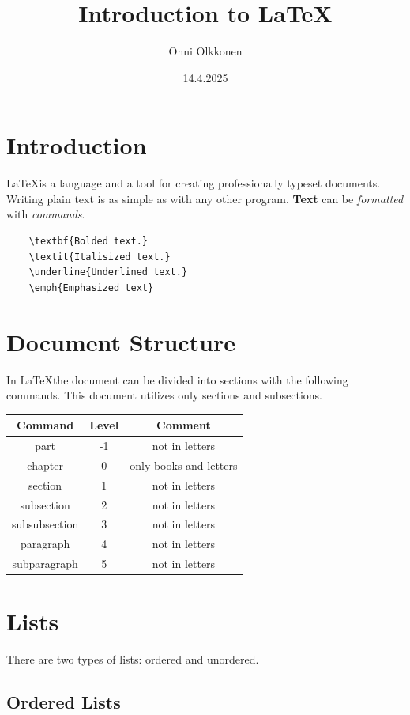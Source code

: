 \documentclass{article}
\title{Introduction to \LaTeX}
\author{Onni Olkkonen}
\date{14.4.2025}
\begin{document}
\maketitle

\section{Introduction}

\LaTeX is a language and a tool for creating professionally typeset documents.
Writing plain text is as simple as with any other program.
\textbf{Text} can be \textit{formatted} with \emph{commands}.

\begin{verbatim}
	\textbf{Bolded text.}
	\textit{Italisized text.}
	\underline{Underlined text.}
	\emph{Emphasized text}
\end{verbatim}

\section{Document Structure}

In \LaTeX the document can be divided into sections with the following commands. This document utilizes only sections and subsections. \newline

\begin{tabular}{ c|c|c }
	Command & Level & Comment \\
	\hline
	part & -1 & not in letters \\
	chapter & 0 & only books and letters \\
	section & 1 & not in letters \\
	subsection & 2 & not in letters \\
	subsubsection & 3 & not in letters \\
	paragraph & 4 & not in letters \\
	subparagraph & 5 & not in letters
\end{tabular}

\newpage

\section{Lists}

There are two types of lists: ordered and unordered.

\subsection{Ordered Lists}
\end{document}
